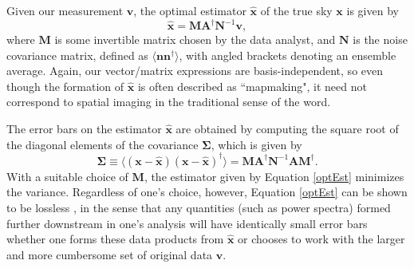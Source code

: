 \documentclass[twocolumn,apj,numberedappendix]{emulateapj}
\newcommand{\vis}{\mathbf{v}}
\newcommand{\x}{\mathbf{x}}
\newcommand{\xhat}{\hat{\mathbf{x}}}
\newcommand{\A}{\mathbf{A}}
\newcommand{\N}{\mathbf{N}}
\begin{document}
Given our measurement $\vis$, the optimal estimator $\xhat$ of the true sky
$\x$ is given by \citep{Tegmark97,Morales2009,dillon_et_al2015}
\begin{equation}
\label{optEst}
\xhat = \mathbf{M} \A^\dagger \N^{-1} \vis,
\end{equation}
where $\mathbf{M}$ is some invertible matrix chosen by the data analyst, and
$\N$ is the noise covariance matrix, defined as $\langle \mathbf{n}
\mathbf{n}^\dagger \rangle$, with angled brackets denoting an ensemble average.
Again, our vector/matrix expressions are basis-independent, so even though the
formation of $\xhat$ is often described as ``mapmaking", it need not correspond
to spatial imaging in the traditional sense of the word.

The error bars on the estimator $\xhat$ are obtained by computing the square root
of the diagonal elements of the covariance $\boldsymbol \Sigma$, which is given by
\begin{equation}
\label{eq:sigma}
\boldsymbol \Sigma \equiv \langle (\x - \xhat) ( \x - \xhat)^\dagger \rangle = \mathbf{M} \A^\dagger \N^{-1} \A\mathbf{M}^\dagger.
\end{equation}
With a suitable choice of $\mathbf{M}$, the estimator given by Equation \eqref{optEst}
minimizes the variance. Regardless of one's choice, however, Equation \eqref{optEst} 
can be shown to be lossless \citep{Tegmark97}, in the sense that any quantities (such as power
spectra) formed further downstream in one's analysis will have identically
small error bars whether one forms these data products from $\xhat$ or chooses
to work with the larger and more cumbersome set of original data $\vis$.
%
%
%
\end{document}
